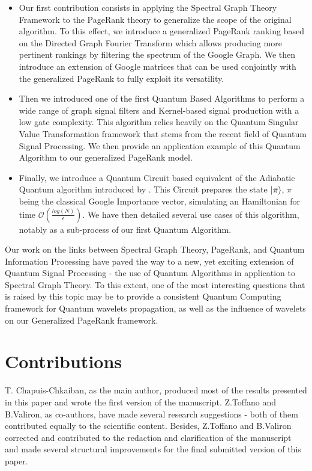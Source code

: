 \documentclass[sn-mathphys]{sn-jnl}%
\theoremstyle{thmstyleone}%
\theoremstyle{thmstyletwo}%
\theoremstyle{thmstylethree}%
\begin{document}
\begin{itemize}
\item Our first contribution consists in applying the Spectral Graph
  Theory Framework to the PageRank theory to generalize the scope of
  the original algorithm. To this effect, we introduce a generalized
  PageRank ranking based on the Directed Graph Fourier Transform which
  allows producing more pertinent rankings by filtering the spectrum
  of the Google Graph. We then introduce an extension of Google
  matrices that can be used conjointly with the generalized PageRank
  to fully exploit its versatility.
    
\item Then we introduced one of the first Quantum Based Algorithms to
  perform a wide range of graph signal filters and Kernel-based signal
  production with a low gate complexity. This algorithm relies heavily
  on the Quantum Singular Value Transformation framework that stems
  from the recent field of Quantum Signal Processing. We then provide
  an application example of this Quantum Algorithm to our generalized
  PageRank model.
    
\item Finally, we introduce a Quantum Circuit based equivalent of the
  Adiabatic Quantum algorithm introduced by
  \cite{garnerone_zanardi_lidar_2012}. This Circuit prepares the state
  $\ket{\pi}$, $\pi$ being the classical Google Importance vector,
  simulating an Hamiltonian for time
  $\mathcal{O}(\frac{log(N)}{\epsilon})$. We have then detailed
  several use cases of this algorithm, notably as a sub-process of our
  first Quantum Algorithm.
    
\end{itemize}

Our work on the links between Spectral Graph Theory, PageRank, and
Quantum Information Processing have paved the way to a new, yet
exciting extension of Quantum Signal Processing - the use of Quantum
Algorithms in application to Spectral Graph Theory. To this extent,
one of the most interesting questions that is raised by this topic may
be to provide a consistent Quantum Computing framework for Quantum
wavelets propagation, as well as the influence of wavelets on our
Generalized PageRank framework.


\section{Contributions}
T. Chapuis-Chkaiban, as the main author, produced most of the results
presented in this paper and wrote the first version of the
manuscript. Z.Toffano and B.Valiron, as co-authors, have made several
research suggestions - both of them contributed equally to the
scientific content. Besides, Z.Toffano and B.Valiron corrected and
contributed to the redaction and clarification of the manuscript and
made several structural improvements for the final submitted version
of this paper.
\end{document}

